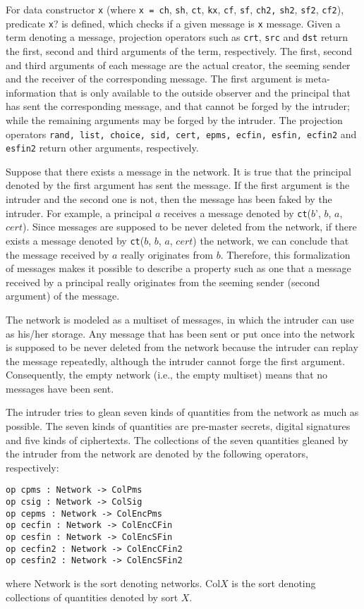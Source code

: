\documentclass[a4paper,fleqn]{cas-dc}
\begin{document}
For data constructor \verb!x! (where \verb!x = ch!, \verb!sh!, \verb!ct!, \verb!kx!, \verb!cf!, \verb!sf!, \verb!ch2,! \verb!sh2!, \verb!sf2!, \verb!cf2!), predicate \verb!x!? is defined, which checks if a given message is \verb!x! message. Given a term denoting a message, projection operators such as \verb!crt!, \verb!src! and \verb!dst! return the first, second and third arguments of the term, respectively. The first, second and  third  arguments  of  each  message are  the  actual creator,  the  seeming  sender  and  the  receiver  of the  corresponding message. The first argument is meta-information that is only available to the outside observer and the principal that has sent the corresponding message, and that cannot be forged by the intruder; while the remaining arguments may be forged by the intruder. The projection operators \verb!rand, list, choice, sid, cert, epms, ecfin, esfin, ecfin2! and \verb!esfin2! return other arguments, respectively.

Suppose that there exists a message in the network. It is true that the principal denoted by the first
argument has sent the message. If the first argument is the
intruder and the second one is not, then the message has been
faked by the intruder. For example, a principal $a$ receives a message denoted by \verb!ct!($b$', $b$, $a$, $cert$). 
Since messages are supposed to be never deleted from the network, if there exists a message denoted by
\verb!ct!($b$, $b$, $a$, $cert$) the network, we can conclude that the message received by $a$ really originates from $b$.
Therefore, this formalization of messages makes it possible to describe a property such as one that a message received by a principal really originates from the seeming sender (second argument) of the message. 

The  network  is  modeled  as  a  multiset  of  messages,  in which the intruder can use as his/her storage. Any message that has been sent or put once into the network is supposed to be never deleted from the network because the intruder can replay the message repeatedly, although the intruder cannot forge the first argument. Consequently, the empty network (i.e., the empty multiset) means that no messages have been sent.

The intruder tries to glean seven kinds of quantities from
the network as much as possible. The seven kinds of quantities are pre-master secrets, digital signatures and five kinds of ciphertexts. The collections of the seven quantities gleaned by the intruder from the network are denoted by the following operators, respectively:
\begin{small}
\begin{verbatim}
op cpms : Network -> ColPms
op csig : Network -> ColSig
op cepms : Network -> ColEncPms
op cecfin : Network -> ColEncCFin
op cesfin : Network -> ColEncSFin
op cecfin2 : Network -> ColEncCFin2
op cesfin2 : Network -> ColEncSFin2
\end{verbatim}
\end{small}	
where Network is the sort denoting networks. Col$X$ is
the sort denoting collections of quantities denoted
by sort $X$.
\end{document}
